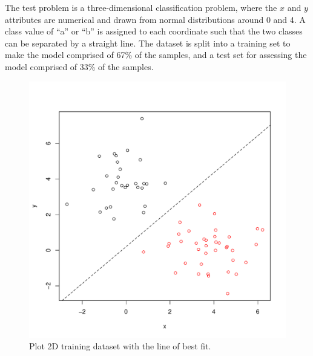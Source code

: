 The test problem is a three-dimensional classification problem, where the $x$ and $y$ attributes are numerical and drawn from normal distributions around 0 and 4. A class value of ``a'' or ``b'' is assigned to each coordinate such that the two classes can be separated by a straight line. The dataset is split into a training set to make the model comprised of 67\% of the samples, and a test set for assessing the model comprised of 33\% of the samples.



\begin{figure}[htp]
\centering
\includegraphics[scale=0.45]{a_regression/logistic_regression_result.pdf}
\caption{Plot 2D training dataset with the line of best fit.}
\label{plot:logistic_regression_result}
\end{figure}


